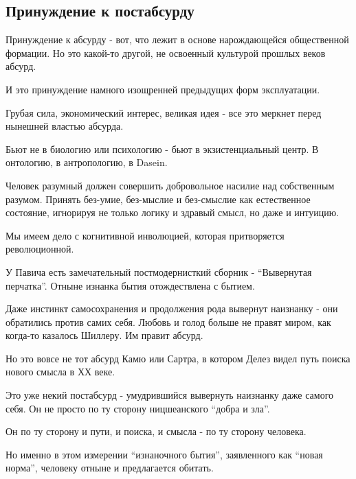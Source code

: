 
 
 
 
 
\subsection{Принуждение к постабсурду}
\label{sec:13_04_2021.fb.miheev_vladislav.1.postabsurd}

Принуждение к абсурду - вот, что лежит в основе нарождающейся общественной
формации. Но это какой-то другой, не освоенный культурой прошлых веков абсурд.

И это принуждение намного изощренней предыдущих форм эксплуатации.

Грубая сила, экономический интерес, великая идея - все это меркнет перед
нынешней властью абсурда. 

Бьют не в биологию или психологию - бьют в экзистенциальный центр. В онтологию,
в антропологию, в Dasein.

Человек разумный должен совершить добровольное насилие над собственным разумом.
Принять без-умие, без-мыслие и без-смыслие как естественное состояние,
игнорируя не только логику и здравый смысл, но даже и интуицию.

Мы имеем дело с когнитивной инволюцией, которая притворяется  революционной.

У Павича есть замечательный постмодернисткий сборник - \enquote{Вывернутая перчатка}.
Отныне изнанка бытия отождествлена с бытием. 

Даже инстинкт самосохранения и продолжения рода вывернут наизнанку - они
обратились против самих себя. Любовь и голод больше не правят миром, как
когда-то казалось Шиллеру. Им правит абсурд.

Но это вовсе не тот абсурд Камю или Сартра, в котором Делез видел путь поиска
нового смысла в ХХ веке. 

Это уже некий постабсурд - умудрившийся вывернуть наизнанку даже самого себя.
Он не просто по ту сторону ницшеанского \enquote{добра и зла}. 

Он по ту сторону и пути, и поиска, и смысла -  по ту сторону человека. 

Но именно в этом  измерении \enquote{изнаночного бытия}, заявленного как \enquote{новая норма},
человеку отныне и предлагается обитать.
